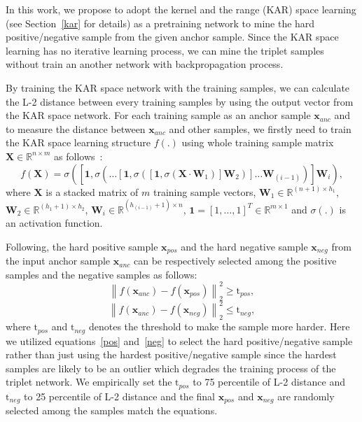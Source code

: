 \documentclass[runningheads]{llncs}
\begin{document}
In this work, we propose to adopt the kernel and the range (KAR) space learning (see Section~\ref{kar} for details) as a pretraining network to mine the hard positive/negative sample from the given anchor sample. Since the KAR space learning has no iterative learning process, we can mine the triplet samples without train an another network with backpropagation process.
 
By training the KAR space network with the training samples, we can calculate the L-2 distance between every training samples by using the output vector from the KAR space network. For each training sample as an anchor sample $\mathbf{x}_{anc}$ and to measure the distance between $\mathbf{x}_{anc}$ and other samples, we firstly need to train the KAR space learning structure $f\left(.\right)$ using whole training sample matrix $\mathbf{X}\in \mathbb{R}^{n\times m}$ as follows~\cite{toh2018gradient}:
\begin{equation}
    f\left(\mathbf{X}\right) = \sigma\left(\left[\mathbf{1},\sigma\left(\dots\left[\mathbf{1},\sigma\left(\left[\mathbf{1},\sigma\left(\mathbf{X}\cdot\mathbf{W}_{1}\right)\right]\mathbf{W}_{2}\right)\right]\dots\mathbf{W}_{(i-1)}\right)\right]\mathbf{W}_{i}\right),
\end{equation}
where $\mathbf{X}$ is a stacked matrix of $m$ training sample vectors, $\mathbf{W}_{1}\in{\mathbb{R}}^{(n+1) \times h_{1}}$, $\mathbf{W}_{2}\in{\mathbb{R}}^{(h_{1}+1) \times h_{2}}$, $\mathbf{W}_{i}\in{\mathbb{R}}^{(h_{(i-1)}+1) \times n}$, $\mathbf{1}=\left[1,\dots,1\right]^{T}\in{\mathbb{R}}^{m \times 1}$ and $\sigma(.)$ is an activation function.

Following, the hard positive sample $\mathbf{x}_{pos}$ and the hard negative sample $\mathbf{x}_{neg}$ from the input anchor sample $\mathbf{x}_{anc}$ can be respectively selected among the positive samples and the negative samples as follows:
\begin{equation}
    {\left\| {{f\left(\mathbf{x}_{anc}\right)} - {f\left(\mathbf{x}_{pos}\right)}} \right\|_2^2} \geq \mathrm{t}_{pos}, \label{pos}
\end{equation}
\begin{equation}
    {\left\| {{f\left(\mathbf{x}_{anc}\right)} - {f\left(\mathbf{x}_{neg}\right)}} \right\|_2^2} \leq \mathrm{t}_{neg},\label{neg}
\end{equation}
where $\mathrm{t}_{pos}$ and $\mathrm{t}_{neg}$ denotes the threshold to make the sample more harder. Here we utilized equations~\eqref{pos} and~\eqref{neg} to select the hard positive/negative sample rather than just using the hardest positive/negative sample since the hardest samples are likely to be an outlier which degrades the training process of the triplet network.
We empirically set the $\mathrm{t}_{pos}$ to 75 percentile of L-2 distance and $\mathrm{t}_{neg}$ to 25 percentile of L-2 distance and the final $\mathbf{x}_{pos}$ and $\mathbf{x}_{neg}$ are randomly selected among the samples match the equations.
\end{document}
